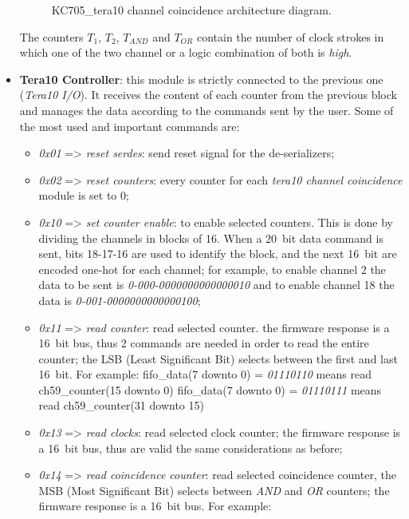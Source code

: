 \begin{itemize}
\begin{figure}[H]
		\caption{KC705\_tera10 channel coincidence architecture diagram.}
		\label{fig:coincidence}
	\end{figure}
	\noindent The counters $T_{1}$, $T_{2}$, $T_{AND}$ and $T_{OR}$ contain the number of clock strokes in which one of the two channel or a logic combination of both is \textit{high}.
	\item \textbf{Tera10 Controller}: this module is strictly connected to the previous one (\textit{Tera10 I/O}). It receives the content of each counter from the previous block and manages the data according to the commands sent by the user. Some of the most used and important commands are:
	\begin{itemize}
		\item \textit{0x01} => \textit{reset serdes}: send reset signal for the de-serializers;
		\item \textit{0x02} => \textit{reset counters}: every counter for each \textit{tera10 channel coincidence} module is set to 0;
		\item \textit{0x10} => \textit{set counter enable}: to enable selected counters. This is done by dividing the channels in blocks of 16. When a 20~bit data command is sent, bits 18-17-16 are used to identify the block, and the next 16~bit are encoded one-hot for each channel; for example, to enable channel 2 the data to be sent is \textit{0-000-0000000000000010} and to enable channel 18 the data is \textit{0-001-0000000000000100};  
		\item \textit{0x11} => \textit{read counter}: read selected counter. the firmware response is a 16~bit bus, thus 2 commands are needed in order to read the entire counter; the LSB (Least Significant Bit) selects between the first and last 16~bit. For example:
		\newline
		fifo\_data(7 downto 0) = \textit{01110110} means read ch59\_counter(15 downto 0)
		\newline
		fifo\_data(7 downto 0) = \textit{01110111} means read ch59\_counter(31 downto 15)
		\item \textit{0x13} => \textit{read clocks}: read selected clock counter; the firmware response is a 16~bit bus, thus are valid the same considerations as before;
		\item \textit{0x14} => \textit{read coincidence counter}: read selected coincidence counter, the MSB (Most Significant Bit) selects between \textit{AND} and \textit{OR} counters; the firmware response is a 16~bit bus. For example:

\end{itemize}
\end{itemize}
